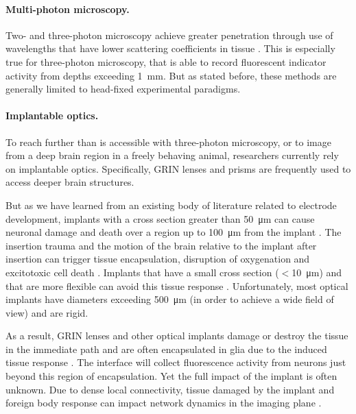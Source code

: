 \paragraph{Multi-photon microscopy.} Two- and three-photon 
microscopy achieve greater penetration through use of 
wavelengths that have lower scattering coefficients in 
tissue \cite{Wang:2017jp}. This is especially true for 
three-photon microscopy, that is able to record 
fluorescent indicator activity from depths exceeding 1~mm.
But as stated before, these methods are generally 
limited to head-fixed experimental paradigms.

\paragraph{Implantable optics.} To reach further than 
is accessible with three-photon microscopy, or to image 
from a deep brain region in a freely behaving animal, 
researchers currently rely on implantable optics. 
Specifically, GRIN lenses \cite{Barretto:2009hk} and 
prisms \cite{Andermann:2013kc} are frequently used to 
access deeper brain structures.

But as we have learned from an existing body of literature related to 
electrode development, implants with a cross section 
greater than 50~\si{\micro\meter} can cause neuronal 
damage and death over a region up to 100~\si{\micro\meter}
from the implant \cite{Seymour:2007dj}. The insertion 
trauma and the motion of the brain relative to the implant 
after insertion can trigger tissue encapsulation, 
disruption of oxygenation and  excitotoxic cell death
\cite{Szarowski:2003cz,Polikov:2005cq,McConnell:2009hr,Freire:2011gl}.
Implants that have a small cross section ($<$10~\si{\micro\meter}) 
and that are more flexible can avoid this tissue response 
\cite{JohnPSeymour:2006td,Harris:2011dy,Kozai:2012bp,Patel:2018cr}.
Unfortunately, most optical implants have diameters exceeding 
500~\si{\micro\meter} (in order to achieve a wide field of view) 
and are rigid.

As a result, GRIN lenses and other optical implants damage 
or destroy the tissue in the immediate path and 
are often encapsulated in glia due to the induced  
tissue response \cite{Lee:2016ko}. The interface will 
collect fluorescence activity from neurons just beyond this 
region of encapsulation. Yet the full impact of the implant 
is often unknown. Due to dense local connectivity, tissue 
damaged by the implant and foreign body response can impact 
network dynamics in the imaging plane 
\cite{Hayn:2015ew,Hayn:2017kj,GossVarley:2017kf}.

